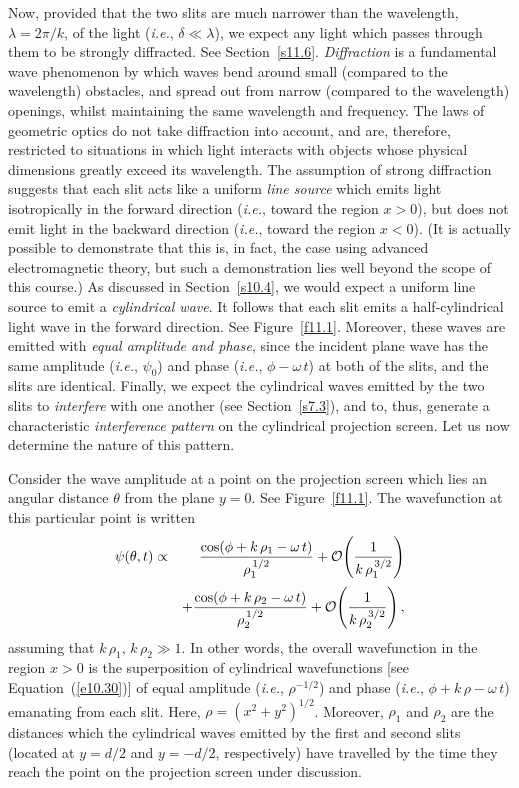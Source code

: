 Now,  provided that the two slits are much narrower than the wavelength, $\lambda=2\pi/k$, of the light ({\em i.e.}, $\delta\ll \lambda$), we expect any light
which passes through them to be strongly diffracted. See Section~\ref{s11.6}. {\em Diffraction}\/ is a fundamental wave phenomenon by which 
waves bend around small (compared to the wavelength) obstacles, and spread out from narrow (compared to the wavelength) openings,
whilst maintaining the same wavelength and frequency.
The
laws of geometric optics do not take diffraction into account, and are, therefore, restricted to situations in
which light interacts with objects whose physical dimensions  greatly exceed its wavelength.
The assumption of strong diffraction suggests that each slit acts like a uniform {\em line source}\/ which emits light isotropically
in the forward direction ({\em i.e.}, toward the region $x>0$), but does not emit light in the
backward direction ({\em i.e.}, toward the region $x<0$). (It is actually possible
to demonstrate that this is, in fact, the case using advanced electromagnetic theory, but such a demonstration lies well beyond the
scope of this course.) As discussed in
Section~\ref{s10.4}, we would expect  a uniform line source to emit a {\em cylindrical wave}. It follows that each slit
emits a half-cylindrical light wave in the forward direction. See Figure~\ref{f11.1}. Moreover, these waves are emitted with  {\em equal amplitude and  phase}, since the incident
plane wave has the same amplitude ({\em i.e.}, $\psi_0$) and phase ({\em i.e.}, $\phi-\omega\,t$) at both of the slits, and the slits are  identical. Finally, we expect the  cylindrical waves emitted by the two slits to {\em interfere}\/ with one
another (see Section~\ref{s7.3}), and to, thus, generate a characteristic {\em interference pattern}\/ on the
cylindrical projection screen. Let us now determine the nature of this pattern.

Consider the wave amplitude at a point on the projection screen which lies an angular distance $\theta$ from the
plane $y=0$. See Figure~\ref{f11.1}. The wavefunction at this particular point 
is written 
\begin{eqnarray}\label{e11.1}
\psi(\theta,t)&\propto&\frac{ \cos(\phi+k\,\rho_1-\omega\,t)}{\rho_1^{\,1/2}}+ {\cal O}\!\left(\frac{1}{k\,\rho_1^{\,3/2}}\right)\nonumber \\[0.5ex]&&
+ \frac{\cos(\phi+k\,\rho_2-\omega\,t)}{\rho_2^{\,1/2}}  + {\cal O}\!\left(\frac{1}{k\,\rho_2^{\,3/2}}\right),
\end{eqnarray}
assuming that $k\,\rho_1,\,k\,\rho_2\gg 1$. In other words, the overall wavefunction in the region $x>0$ is the superposition  of cylindrical 
wavefunctions [see  Equation~(\ref{e10.30})] of equal amplitude ({\em i.e.}, $\rho^{-1/2}$) and phase ({\em  i.e.}, $\phi+k\,\rho-\omega\,t$) emanating from each  slit. Here, $\rho=(x^2+y^2)^{1/2}$. Moreover, $\rho_1$ and $\rho_2$ are the distances which the cylindrical waves emitted by the first and second slits (located at $y=d/2$ and $y=-d/2$, respectively) have travelled by the time they reach the point on the projection screen under discussion.

